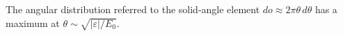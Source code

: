 The angular distribution referred to the solid-angle element $d\mathit{o}\approx2\pi\theta\,d\theta$ has a maximum at $\theta\sim\sqrt{|\varepsilon|/E_0}$.
